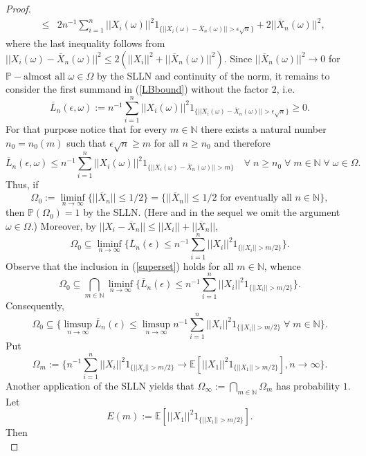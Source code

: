 \documentclass[10pt,a4paper]{amsart}
\begin{document}
\begin{proof}
\begin{eqnarray}
&\le& 2 n^{-1} \sum_{i=1}^n ||X_i(\omega)||^2 1_{\{||X_i(\omega)-\overline{X}_n(\omega)||> \epsilon \sqrt{n}\}}+2 ||\overline{X}_n(\omega)||^2, \label{LBbound}
\end{eqnarray}
where the last inequality follows from $||X_i(\omega)-\overline{X}_n(\omega)||^2 \le 2 (||X_i||^2+||\overline{X}_n(\omega)||^2)$. Since
$||\overline{X}_n(\omega)||^2 \rightarrow 0$ for $\mathbb{P}-\text{almost all } \omega \in \Omega$ by the SLLN and continuity of the norm, it remains to consider the first summand in (\ref{LBbound}) without the factor $2$, i.e.
$$
 \overline{L}_n(\epsilon,\omega):=n^{-1} \sum_{i=1}^n ||X_i(\omega)||^2 1_{\{||X_i(\omega)-\overline{X}_n(\omega)||> \epsilon \sqrt{n}\}} \ge 0.
$$
For that purpose notice that for every $m \in \mathbb{N}$ there exists a natural number $n_0=n_0(m)$ such that $\epsilon \sqrt{n} \ge m$ for all
$n \ge n_0$ and therefore
$$
 \overline{L}_n(\epsilon,\omega) \le n^{-1} \sum_{i=1}^n ||X_i(\omega)||^2 1_{\{||X_i(\omega)-\overline{X}_n(\omega)||> m\}} \quad \forall \; n \ge n_0 \; \forall\; m \in \mathbb{N} \; \forall \; \omega \in \Omega.
$$
Thus, if
$$
\Omega_0:= \liminf_{n \rightarrow \infty} \{||\overline{X}_n|| \le 1/2\}= \{||\overline{X}_n|| \le 1/2 \text{ for eventually all } n \in \mathbb{N}\},
$$
then $\mathbb{P}(\Omega_0)=1$ by the SLLN. (Here and in the sequel we omit the argument $\omega \in \Omega$.) Moreover, by $||X_i-\overline{X}_n||\le ||X_i||+ ||\overline{X}_n||$,
\begin{equation} \label{superset}
 \Omega_0 \subseteq \liminf_{n \rightarrow \infty} \{\overline{L}_n(\epsilon) \le n^{-1} \sum_{i=1}^n ||X_i||^2 1_{\{||X_i||> m/2\}}\}.
\end{equation}
Observe that the inclusion in (\ref{superset}) holds for all $m \in \mathbb{N}$, whence
$$
 \Omega_0 \subseteq \bigcap _{m \in \mathbb{N}} \liminf_{n \rightarrow \infty} \{\overline{L}_n(\epsilon) \le n^{-1} \sum_{i=1}^n ||X_i||^2 1_{\{||X_i||> m/2\}}\}.
$$
Consequently,
$$
 \Omega_0 \subseteq \{\limsup_{n \rightarrow \infty}\overline{L}_n(\epsilon) \le \limsup_{n \rightarrow \infty}n^{-1} \sum_{i=1}^n ||X_i||^2 1_{\{||X_i||> m/2\}} \; \forall \; m \in \mathbb{N}\}.
$$
Put
$$
  \Omega_m:=\{n^{-1} \sum_{i=1}^n ||X_i||^2 1_{\{||X_i||> m/2\}} \rightarrow \mathbb{E}[||X_1||^2 1_{\{||X_1||> m/2\}}], n \rightarrow \infty\}.
$$
Another application of the SLLN yields that $\Omega_\infty := \bigcap_{m \in \mathbb{N}} \Omega_m$ has probability $1$.
Let
$$
  E(m):= \mathbb{E}[||X_1||^2 1_{\{||X_1||> m/2\}}].
$$
Then
\begin{equation} \label{superset2}

\end{equation}
\end{proof}
\end{document}

